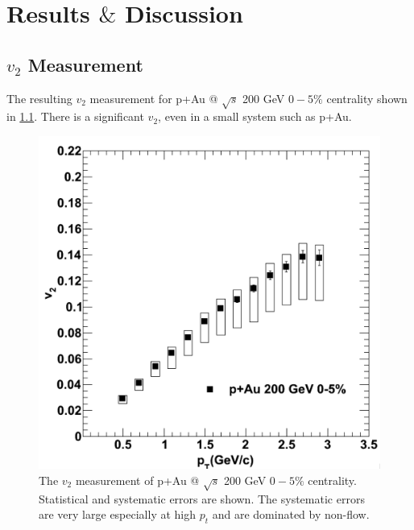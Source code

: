 \chapter{Results $\&$ Discussion}
\section{$v_2$ Measurement}
The resulting $v_2$ measurement for p+Au @ $\sqrt{s}$ 200 GeV $0-5\%$ centrality shown in \ref{fig:pau_points_alone}. There is a significant $v_2$, even in a small system such as p+Au.

\begin{figure}
\begin{center}
\includegraphics[width=0.5\linewidth]{figs/pau_points.png}
\caption{The $v_2$ measurement of p+Au @ $\sqrt{s}$ 200 GeV $0-5\%$ centrality. Statistical and systematic errors are shown. The systematic errors are very large especially at high $p_t$ and are dominated by non-flow.}
\label{fig:pau_points_alone}
\end{center}
\end{figure}
